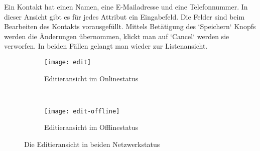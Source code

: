 Ein Kontakt hat einen Namen, eine E-Mailadresse und eine Telefonnummer. In dieser Ansicht gibt es für jedes Attribut ein Eingabefeld. Die Felder sind beim Bearbeiten des Kontakts vorausgefüllt. Mittels Betätigung des `Speichern` Knopfs werden die Änderungen übernommen, klickt man auf `Cancel` werden sie verworfen. In beiden Fällen gelangt man wieder zur Listenansicht.
\begin{figure}[H]
  \centering
  \begin{subfigure}[t]{0.49\textwidth}
          \texttt{[image: edit]}
          \caption{Editieransicht im Onlinestatus}
          \label{fig:edit-online}
  \end{subfigure}
  ~ 
  \begin{subfigure}[t]{0.49\textwidth}
          \texttt{[image: edit-offline]}
          \caption{Editieransicht im Offlinestatus}
          \label{fig:edit-offline}
  \end{subfigure}
  \grayRule
  \caption{Die Editieransicht in beiden Netzwerkstatus}
  \label{fig:edit}
\end{figure}
